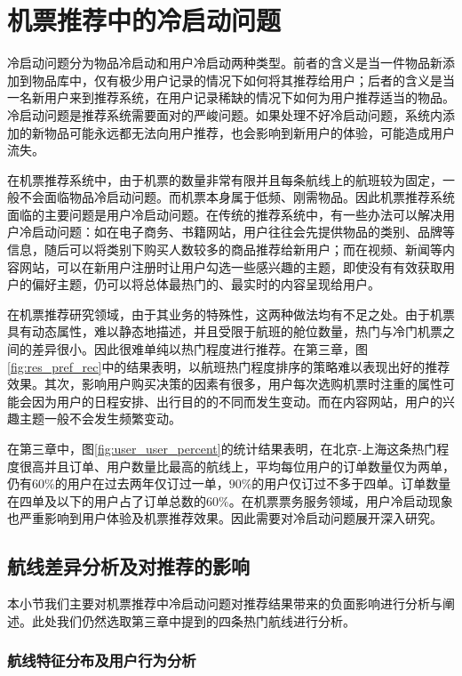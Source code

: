 
\chapter{机票推荐中的冷启动问题}
\label{chap:cold}

冷启动问题分为物品冷启动和用户冷启动两种类型。前者的含义是当一件物品新添加到物品库中，仅有极少用户记录的情况下如何将其推荐给用户；后者的含义是当一名新用户来到推荐系统，在用户记录稀缺的情况下如何为用户推荐适当的物品。冷启动问题是推荐系统需要面对的严峻问题。如果处理不好冷启动问题，系统内添加的新物品可能永远都无法向用户推荐，也会影响到新用户的体验，可能造成用户流失。

在机票推荐系统中，由于机票的数量非常有限并且每条航线上的航班较为固定，一般不会面临物品冷启动问题。而机票本身属于低频、刚需物品。因此机票推荐系统面临的主要问题是用户冷启动问题。在传统的推荐系统中，有一些办法可以解决用户冷启动问题：如在电子商务、书籍网站，用户往往会先提供物品的类别、品牌等信息，随后可以将类别下购买人数较多的商品推荐给新用户；而在视频、新闻等内容网站，可以在新用户注册时让用户勾选一些感兴趣的主题，即使没有有效获取用户的偏好主题，仍可以将总体最热门的、最实时的内容呈现给用户。

在机票推荐研究领域，由于其业务的特殊性，这两种做法均有不足之处。由于机票具有动态属性，难以静态地描述，并且受限于航班的舱位数量，热门与冷门机票之间的差异很小。因此很难单纯以热门程度进行推荐。在第三章，图\ref{fig:res_pref_rec}中的结果表明，以航班热门程度排序的策略难以表现出好的推荐效果。其次，影响用户购买决策的因素有很多，用户每次选购机票时注重的属性可能会因为用户的日程安排、出行目的的不同而发生变动。而在内容网站，用户的兴趣主题一般不会发生频繁变动。

在第三章中，图\ref{fig:user_user_percent}的统计结果表明，在北京-上海这条热门程度很高并且订单、用户数量比最高的航线上，平均每位用户的订单数量仅为两单，仍有$60\%$的用户在过去两年仅订过一单，$90\%$的用户仅订过不多于四单。订单数量在四单及以下的用户占了订单总数的$60\%$。在机票票务服务领域，用户冷启动现象也严重影响到用户体验及机票推荐效果。因此需要对冷启动问题展开深入研究。


\section{航线差异分析及对推荐的影响}
本小节我们主要对机票推荐中冷启动问题对推荐结果带来的负面影响进行分析与阐述。此处我们仍然选取第三章中提到的四条热门航线进行分析。

\subsection{航线特征分布及用户行为分析}

